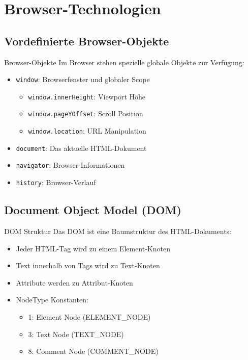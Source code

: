 \section{Browser-Technologien}

\subsection{Vordefinierte Browser-Objekte}

\begin{definition}{Browser-Objekte}
    Im Browser stehen spezielle globale Objekte zur Verfügung:
    \begin{itemize}
        \item \texttt{window}: Browserfenster und globaler Scope
            \begin{itemize}
                \item \texttt{window.innerHeight}: Viewport Höhe
                \item \texttt{window.pageYOffset}: Scroll Position
                \item \texttt{window.location}: URL Manipulation
            \end{itemize}
        \item \texttt{document}: Das aktuelle HTML-Dokument
        \item \texttt{navigator}: Browser-Informationen
        \item \texttt{history}: Browser-Verlauf
    \end{itemize}
\end{definition}

\subsection{Document Object Model (DOM)}

\begin{concept}{DOM Struktur}
    Das DOM ist eine Baumstruktur des HTML-Dokuments:
    \begin{itemize}
        \item Jeder HTML-Tag wird zu einem Element-Knoten
        \item Text innerhalb von Tags wird zu Text-Knoten
        \item Attribute werden zu Attribut-Knoten
        \item NodeType Konstanten:
            \begin{itemize}
                \item 1: Element Node (ELEMENT_NODE)
                \item 3: Text Node (TEXT_NODE)
                \item 8: Comment Node (COMMENT_NODE)
            \end{itemize}
    \end{itemize}
\end{concept}

